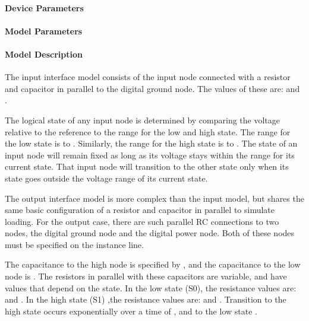 \paragraph{Device Parameters}



\paragraph{Model Parameters}



\paragraph{Model Description}

The input interface model consists of the input node connected with a resistor and
capacitor in parallel to the digital ground node.  The values of these are: 
and .  

The logical state of any input node is determined by comparing the voltage relative
to the reference to the range for the low and high state.  The range for the low
state is  to .  Similarly, the range for the high state
is  to .  The state of an input node will remain fixed as
long as its voltage stays within the range for its current state.  That input node will
transition to the other state only when its state goes outside the voltage range of
its current state.

The output interface model is more complex than the input model, but shares the same
basic configuration of a resistor and capacitor in parallel to simulate loading.  For
the output case, there are such parallel RC connections to two nodes, the digital
ground node and the digital power node.  Both of these nodes must be specified on
the instance line.

The capacitance to the high node is specified by , and the capacitance to the low
node is .  The resistors in parallel with these capacitors are variable, and have
values that depend on the state.  In the low state (S0), the resistance values are:
 and .  In the high state (S1) ,the resistance values are: 
 and .  Transition to the high state occurs exponentially over
a time of , and to the low state .

